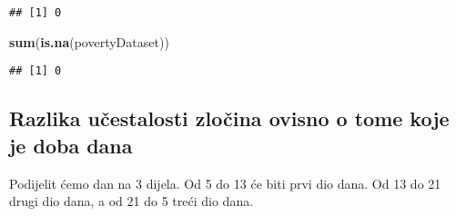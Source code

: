 \documentclass[
]{article}
\newenvironment{Shaded}{\begin{snugshade}}{\end{snugshade}}
\newcommand{\ControlFlowTok}[1]{\textcolor[rgb]{0.13,0.29,0.53}{\textbf{#1}}}
\newcommand{\DataTypeTok}[1]{\textcolor[rgb]{0.13,0.29,0.53}{#1}}
\newcommand{\DecValTok}[1]{\textcolor[rgb]{0.00,0.00,0.81}{#1}}
\newcommand{\KeywordTok}[1]{\textcolor[rgb]{0.13,0.29,0.53}{\textbf{#1}}}
\newcommand{\NormalTok}[1]{#1}
\newcommand{\OperatorTok}[1]{\textcolor[rgb]{0.81,0.36,0.00}{\textbf{#1}}}
\newcommand{\StringTok}[1]{\textcolor[rgb]{0.31,0.60,0.02}{#1}}
\begin{document}
\begin{verbatim}
## [1] 0
\end{verbatim}

\begin{Shaded}
\begin{Highlighting}[]
\KeywordTok{sum}\NormalTok{(}\KeywordTok{is.na}\NormalTok{(povertyDataset))}
\end{Highlighting}
\end{Shaded}

\begin{verbatim}
## [1] 0
\end{verbatim}

\hypertarget{razlika-uux10destalosti-zloux10dina-ovisno-o-tome-koje-je-doba-dana}{%
\subsection{Razlika učestalosti zločina ovisno o tome koje je doba
dana}\label{razlika-uux10destalosti-zloux10dina-ovisno-o-tome-koje-je-doba-dana}}

Podijelit ćemo dan na 3 dijela. Od 5 do 13 će biti prvi dio dana. Od 13
do 21 drugi dio dana, a od 21 do 5 treći dio dana.

\begin{Shaded}
\end{Shaded}
\end{document}
